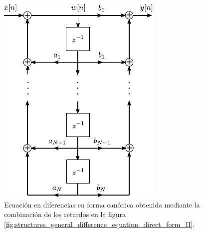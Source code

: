 \documentclass[a4paper]{report}
\begin{document}
\begin{figure}[!htb]
  \begin{minipage}[c]{0.42\textwidth}
    \includegraphics[width=\textwidth]{figuras/structures_general_difference_equation_canonic_form.pdf}
  \end{minipage}\hfill
  \begin{minipage}[c]{0.48\textwidth}
    \caption{
     Ecuación en diferencias en forma canónica obtenida mediante la combinación de los retardos en la figura \ref{fig:structures_general_difference_equation_direct_form_II}. 
    }\label{fig:structures_general_difference_equation_canonic_form}
  \end{minipage}
\end{figure} 
 
\end{document}
